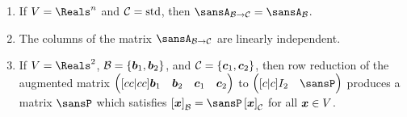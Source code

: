 \documentclass[12pt]{article}
\begin{document}
\begin{enumerate}[topsep=0.125in, itemsep=0.625in]
\begin{enumerate}[label=(\alph*),itemsep=11mm,parsep=3mm]
			\item If $V=\Reals^n$ and $\mathcal{C}=\operatorname{std}$, then $\sansA_{\calB\to\calC}=\sansA_\calB$.
			
			\item The columns of the matrix $\sansA_{\calB\to\calC}$ are linearly independent.
			
			\item If $V=\Reals^2$, $\mathcal{B}=\{\boldsymbol{b}_1,\boldsymbol{b}_2\}$, and $\mathcal{C}=\{\boldsymbol{c}_1,\boldsymbol{c}_2\}$, then row reduction of the augmented matrix $\pmatgrid{cc|cc}{\vect{b}_1 & \vect{b}_2 & \vect{c}_1 & \vect{c}_2}$ to $\pmatgrid{c | c}{I_2 & \sansP}$ produces a matrix $\sansP$ which satisfies $\left[\vect{x}\right]_\calB=\sansP\left[\vect{x}\right]_\calC$ for all $\boldsymbol{x}\in V$.
		\end{enumerate}
	\end{enumerate}
\end{document}
